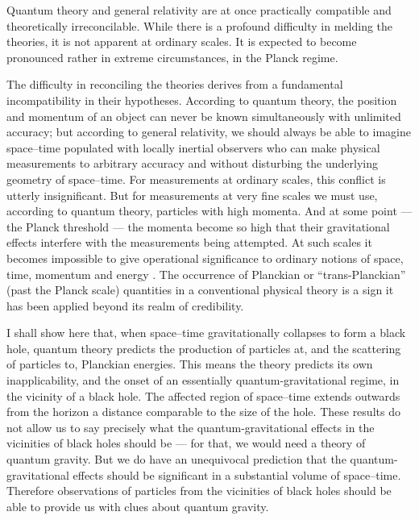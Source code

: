 \documentclass[11pt]{article}
\begin{document}
Quantum theory and general relativity are at once practically compatible and
theoretically irreconcilable.   While there is a profound difficulty in melding
the theories, it is not apparent at ordinary scales.  It is expected to become
pronounced rather in extreme circumstances, in the Planck regime.

The difficulty in reconciling the theories derives from a fundamental
incompatibility in their hypotheses. According to quantum theory, the position
and momentum of an object can never be known simultaneously with unlimited
accuracy; but according to general relativity, we should always be able to
imagine space--time populated with locally inertial observers who can make
physical measurements  to arbitrary accuracy and without disturbing the
underlying geometry of space--time.    For measurements at ordinary scales,
this conflict is utterly insignificant.  But for measurements at very fine
scales we must use, according to quantum theory, particles with high momenta. 
And at some point --- the Planck threshold --- the momenta become so high that
their gravitational effects interfere with the measurements being attempted. 
At such scales it becomes impossible to give operational significance to
ordinary notions of space, time, momentum and energy \cite{DeWitt:1962}. The
occurrence of Planckian or ``trans-Planckian'' (past the Planck scale)
quantities in a conventional physical theory is a sign it has been applied
beyond its realm of credibility.

I shall show here that, when space--time gravitationally collapses to form a
black hole, quantum theory predicts the production of particles at, and the
scattering of particles to, Planckian energies.  This means the theory predicts
its own inapplicability, and the onset of an essentially quantum-gravitational
regime, in the vicinity of a black hole.  The affected region of space--time
extends outwards from the horizon a distance comparable to the size of the
hole. These results do not allow us to say precisely what the
quantum-gravitational effects in the vicinities of black holes should be ---
for that,  we would need a theory of quantum gravity.  But we do have an
unequivocal prediction that the quantum-gravitational effects should be
significant in a substantial volume of space--time.   Therefore observations of
particles from the vicinities of black holes should be able to provide us with
clues about quantum gravity.
\end{document}
